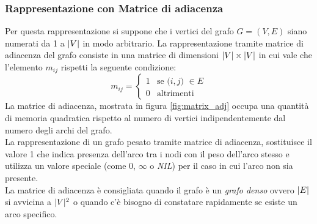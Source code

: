 \subsubsection{Rappresentazione con Matrice di adiacenza}
Per questa rappresentazione si suppone che i vertici del grafo $G = (V, E)$ siano numerati da 1 a $\arrowvert V\arrowvert$ in modo arbitrario. La rappresentazione tramite matrice di adiacenza del grafo consiste in una matrice di dimensioni $\arrowvert V\arrowvert \times \arrowvert V\arrowvert$ in cui vale che l'elemento $m_{ij}$ rispetti la seguente condizione:\\
\begin{equation*}
m_{ij} = \begin{cases}
1 &\text{se ($i,j$) $\in E$}\\
0 &\text{altrimenti}
\end{cases}
\end{equation*}
La matrice di adiacenza, mostrata in figura \ref{fig:matrix_adj} occupa una quantità di memoria quadratica rispetto al numero di vertici indipendentemente dal numero degli archi del grafo.\\
La rappresentazione di un grafo pesato tramite matrice di adiacenza, sostituisce il valore 1 che indica presenza dell'arco tra i nodi con il peso dell'arco stesso e utilizza un valore speciale (come 0, $\infty$ o \textit{NIL}) per il caso in cui l'arco non sia presente.\\
La matrice di adiacenza è consigliata quando il grafo è un \emph{grafo denso}  ovvero $\arrowvert E\arrowvert$ si avvicina a $\arrowvert V\arrowvert ^2$ o quando c'è bisogno di constatare rapidamente se esiste un arco specifico.

